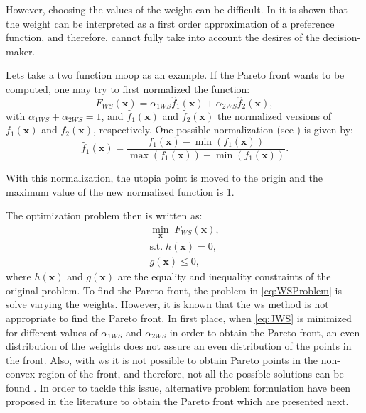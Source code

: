 However, choosing the values of the weight can be difficult. In \citet{Marler2010} it is shown that the weight can be interpreted as a first order approximation of a preference function, and therefore, cannot fully take into account the desires of the decision-maker.

Lets take a two function \gls{moop} as an example. If the Pareto front wants to be computed, one may try to first normalized the function:
\begin{equation}
F_{WS}(\mathbf{x}) = \alpha_{1WS} \hat{f}_{1}(\mathbf{x}) + \alpha_{2WS} \hat{f}_{2}(\mathbf{x}),
\label{eq:JWS}
\end{equation}
with $\alpha_{1WS} + \alpha_{2WS}=1$, and $\hat{f}_{1}(\mathbf{x})$ and $\hat{f}_{2}(\mathbf{x})$ the normalized versions of $f_{1}(\mathbf{x})$ and $f_{2}(\mathbf{x})$, respectively. One possible normalization (see \citet{Marler2004}) is given by:
\begin{equation}
\hat{f}_{1}(\mathbf{x}) = \frac{f_{1}(\mathbf{x})-\min{\left( f_{1}(\mathbf{x})\right) }}{\max{(f_{1}(\mathbf{x}))}-\min{\left( f_{1}(\mathbf{x})\right) }}.
\label{eq:NormalizedJ}
\end{equation}

With this normalization, the utopia point is moved to the origin and the maximum value of the new normalized function is 1.

The optimization problem then is written as:
\begin{equation}
\begin{gathered}
\min_{\mathbf{x}}{\; F_{WS}(\mathbf{x})}, \\
\text{s.t.} \; h(\mathbf{x})=0, \\
g(\mathbf{x}) \leq 0,
\end{gathered}
\label{eq:WSProblem}
\end{equation}
%
where $h(\mathbf{x})$ and $g(\mathbf{x})$ are the equality and inequality constraints of the original problem. To find the Pareto front, the problem in \eqref{eq:WSProblem} is solve varying the weights. However, it is known that the \gls{ws} method is not appropriate to find the Pareto front. In first place, when \eqref{eq:JWS} is minimized for different values of $\alpha_{1WS}$ and $\alpha_{2WS}$ in order to obtain the Pareto front, an even distribution of the weights does not assure an even distribution of the points in the front. Also, with \gls{ws} it is not possible to obtain Pareto points in the non-convex region of the front, and therefore, not all the possible solutions can be found \citep{Das1997}. In order to tackle this issue, alternative problem formulation have been proposed in the literature to obtain the Pareto front which are presented next.
